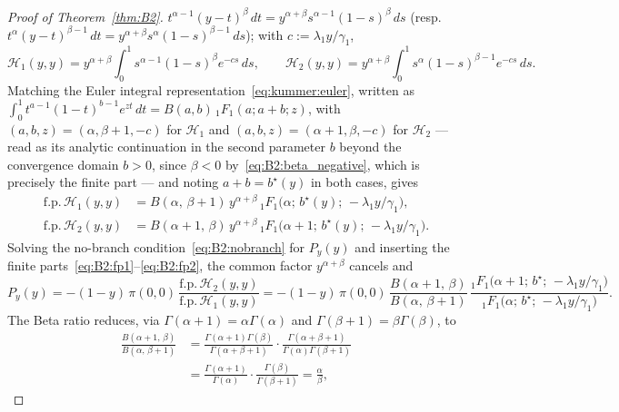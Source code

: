\begin{proof}[Proof of Theorem~\ref{thm:B2}]
$t^{\alpha-1}(y-t)^{\beta}\,dt=y^{\alpha+\beta}s^{\alpha-1}(1-s)^{\beta}\,ds$ (resp.\
$t^{\alpha}(y-t)^{\beta-1}\,dt=y^{\alpha+\beta}s^{\alpha}(1-s)^{\beta-1}\,ds$); with
$c:=\lambda_1 y/\gamma_1$,
\[
    \mathcal{H}_1(y,y)=y^{\alpha+\beta}\!\int_0^1\! s^{\alpha-1}(1-s)^{\beta}e^{-cs}\,ds,
    \qquad
    \mathcal{H}_2(y,y)=y^{\alpha+\beta}\!\int_0^1\! s^{\alpha}(1-s)^{\beta-1}e^{-cs}\,ds.
\]
Matching the Euler integral representation~\eqref{eq:kummer:euler}, written as
$\int_0^1 t^{a-1}(1-t)^{b-1}e^{zt}\,dt=B(a,b)\,{}_1F_1(a;a+b;z)$, with
$(a,b,z)=(\alpha,\beta+1,-c)$ for $\mathcal{H}_1$ and $(a,b,z)=(\alpha+1,\beta,-c)$ for
$\mathcal{H}_2$ --- read as its analytic continuation in the second parameter $b$ beyond the
convergence domain $b>0$, since $\beta<0$ by~\eqref{eq:B2:beta_negative}, which is precisely
the finite part --- and noting $a+b=b^\star(y)$ in both cases, gives
\begin{align}
    \mathrm{f.p.}\,\mathcal{H}_1(y,y)
        &= B(\alpha,\,\beta+1)\,y^{\alpha+\beta}\,
           {}_1F_1\!\bigl(\alpha;\,b^\star(y);\,-\lambda_1 y/\gamma_1\bigr),
    \label{eq:B2:fp1}\\[3pt]
    \mathrm{f.p.}\,\mathcal{H}_2(y,y)
        &= B(\alpha+1,\,\beta)\,y^{\alpha+\beta}\,
           {}_1F_1\!\bigl(\alpha+1;\,b^\star(y);\,-\lambda_1 y/\gamma_1\bigr).
    \label{eq:B2:fp2}
\end{align}
Solving the no-branch condition~\eqref{eq:B2:nobranch} for $P_y(y)$ and inserting the
finite parts~\eqref{eq:B2:fp1}--\eqref{eq:B2:fp2}, the common factor $y^{\alpha+\beta}$
cancels and
\begin{equation}
    P_y(y)
    = -(1-y)\,\pi(0,0)\,\frac{\mathrm{f.p.}\,\mathcal{H}_2(y,y)}{\mathrm{f.p.}\,\mathcal{H}_1(y,y)}
    = -(1-y)\,\pi(0,0)\,\frac{B(\alpha+1,\,\beta)}{B(\alpha,\,\beta+1)}\,
        \frac{{}_1F_1\!\bigl(\alpha+1;\,b^\star;\,-\lambda_1 y/\gamma_1\bigr)}
             {{}_1F_1\!\bigl(\alpha;\,b^\star;\,-\lambda_1 y/\gamma_1\bigr)}.
    \label{eq:B2:Py_ratio}
\end{equation}
The Beta ratio reduces, via $\Gamma(\alpha+1)=\alpha\Gamma(\alpha)$ and
$\Gamma(\beta+1)=\beta\Gamma(\beta)$, to
\begin{align}
    \frac{B(\alpha+1,\,\beta)}{B(\alpha,\,\beta+1)}
    &= \frac{\Gamma(\alpha+1)\Gamma(\beta)}{\Gamma(\alpha+\beta+1)}
       \cdot\frac{\Gamma(\alpha+\beta+1)}{\Gamma(\alpha)\Gamma(\beta+1)} \nonumber\\
    &= \frac{\Gamma(\alpha+1)}{\Gamma(\alpha)}\cdot\frac{\Gamma(\beta)}{\Gamma(\beta+1)}
       = \frac{\alpha}{\beta},

\end{align}
\end{proof}
